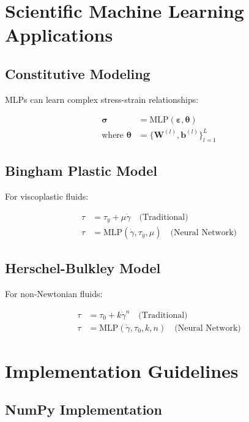 \documentclass{article}
\begin{document}
\section{Scientific Machine Learning Applications}

\subsection{Constitutive Modeling}

MLPs can learn complex stress-strain relationships:

\begin{align}
\boldsymbol{\sigma} &= \text{MLP}(\boldsymbol{\varepsilon}, \boldsymbol{\theta}) \\
\text{where } \boldsymbol{\theta} &= \{\boldsymbol{W}^{(l)}, \boldsymbol{b}^{(l)}\}_{l=1}^{L}
\end{align}

\subsection{Bingham Plastic Model}

For viscoplastic fluids:

\begin{align}
\tau &= \tau_y + \mu \dot{\gamma} \quad \text{(Traditional)} \\
\tau &= \text{MLP}(\dot{\gamma}, \tau_y, \mu) \quad \text{(Neural Network)}
\end{align}

\subsection{Herschel-Bulkley Model}

For non-Newtonian fluids:

\begin{align}
\tau &= \tau_0 + k \dot{\gamma}^n \quad \text{(Traditional)} \\
\tau &= \text{MLP}(\dot{\gamma}, \tau_0, k, n) \quad \text{(Neural Network)}
\end{align}

\section{Implementation Guidelines}

\subsection{NumPy Implementation}
\end{document}
